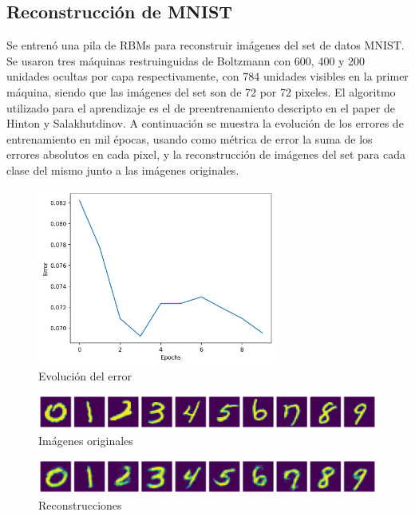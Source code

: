\documentclass[12pt,a4paper]{article}
\begin{document}
\subsection{Reconstrucción de MNIST}
Se entrenó una pila de RBMs para reconstruir imágenes del set de datos MNIST. Se usaron tres máquinas restruinguidas de Boltzmann con 600, 400 y 200 unidades ocultas por capa respectivamente, con 784 unidades visibles en la primer máquina, siendo que las imágenes del set son de 72 por 72 pixeles. El algoritmo utilizado para el aprendizaje es el de preentrenamiento descripto en el paper de Hinton y Salakhutdinov. A continuación se muestra la evolución de los errores de entrenamiento en mil épocas, usando como métrica de error la suma de los errores absolutos en cada pixel, y la reconstrucción de imágenes del set para cada clase del mismo junto a las imágenes originales.
\begin{figure}[H]
    \includegraphics[width=0.7\textwidth]{img/16-training_error.png}
    \centering
    \caption*{Evolución del error}
\end{figure}
\begin{figure}[H]
    \includegraphics[width=\linewidth]{img/17-original_images.png}
    \centering
    \caption*{Imágenes originales}
\end{figure}
\begin{figure}[H]
    \includegraphics[width=\linewidth]{img/18-reconstructions.png}
    \centering
    \caption*{Reconstrucciones}
\end{figure}
\end{document}
